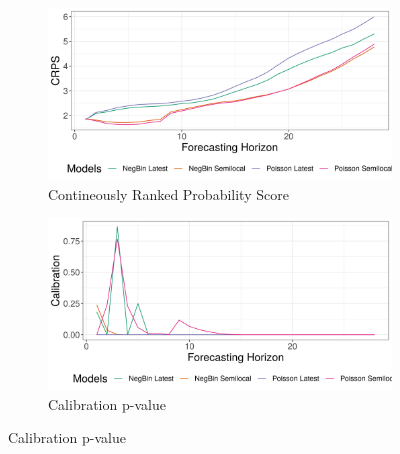 \begin{figure}[H]
\begin{subfigure}{0.5\textwidth}
  \centering
  \includegraphics[width=\linewidth]{../output/national_crps.png}  
  \caption{Contineously Ranked Probability Score}
  \label{fig:sub-first}
\end{subfigure}
\begin{subfigure}{0.5\textwidth}
  \centering
  \includegraphics[width=\linewidth]{../output/national_calibration.png}  
  \caption{Calibration p-value}
  \label{fig:sub-second}
\end{subfigure}


\end{figure}
